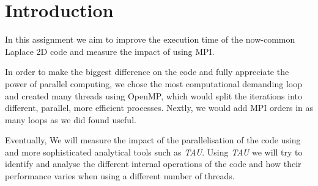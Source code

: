 \section{Introduction}

In this assignment we aim to improve the execution time of the now-common Laplace 2D code and measure the impact of using MPI.

In order to make the biggest difference on the code and fully appreciate the power of parallel computing, we chose the most computational demanding loop and created many threads using OpenMP, which would split the iterations into different, parallel, more efficient processes. Nextly, we would add MPI orders in as many loops as we did found useful. 

Eventually, We will measure the impact of the parallelisation of the code using and more sophisticated analytical tools such as \emph{TAU}. Using \emph{TAU} we will try to identify and analyse the different internal operations of the code and how their performance varies when using a different number of threads.





